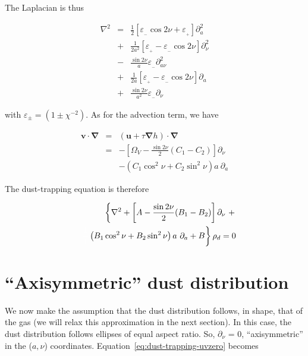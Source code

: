 \documentclass[apj]{emulateapj}
\renewcommand{\v}[1]{{\boldsymbol{#1}}} %
\def\white#1{\textcolor{white}{#1}}
\newcommand{\del}{\v{\nabla}}
\newcommand{\grad}{\del}
\newcommand{\Laplace}{\nabla^2}
\newcommand{\beq}{\begin{equation}}
\newcommand{\eeq}{\end{equation}}
\newcommand{\beqn}{\begin{eqnarray}}
\newcommand{\eeqn}{\end{eqnarray}}
\newcommand{\epsp}{\varepsilon_{_{+}}}
\newcommand{\epsm}{\varepsilon_{_{-}}}
\begin{document}
The Laplacian is thus 

\beqn
\Laplace{} &= &\frac{1}{2}\left[ \epsm \cos 2\nu + \epsp\right] \partial^2_a  \\
                &+& \frac{1}{2a^2}\left[ \epsp - \epsm \cos 2\nu\right] \partial^2_\nu  \\
                &-& \frac{\sin 2\nu}{a}\epsm \partial^2_{a\nu}  \\
                &+& \frac{1}{2a}\left[ \epsp - \epsm \cos 2\nu\right] \partial_a  \\
                &+& \frac{\sin 2\nu}{a^2} \epsm\partial_\nu
\eeqn

\noindent with $\varepsilon_{\pm} = (1 \pm \chi^{-2})$.  As for the advection term, we have 

\beqn
\v{v}\cdot\del &=& (\v{u} + \tau \grad h) \cdot \del \nonumber \\
&=& - \left[\varOmega_V - \frac{\sin2\nu}{2}  (C_1 -  C_2)\right]\partial_\nu \nonumber \\
&&- \left( C_1 \cos^2\nu   + C_2\sin^2\nu \right) a \ \partial_a 
\eeqn


The dust-trapping equation is therefore 


\beqn \label{eq:dust-trapping-uvzero}
&& \left\{ \Laplace{} + \left[A - \frac{\sin2\nu}{2}  (B_1 - B_2)\right]\partial_\nu \ +  \right.  \nonumber\\
&& \left. \white{\frac{1}{1}}\left( B_1 \cos^2\nu   + B_2\sin^2\nu
  \right) a \ \partial_a  + B \right\} \rho_d = 0 
\eeqn



\section{``Axisymmetric'' dust distribution}

We now make the assumption that the dust distribution follows, in shape, that of
the gas (we will relax this approximation in the next section). In this case, the
dust distribution follows ellipses of equal aspect ratio. So,
$\partial_\nu$ = 0, ``axisymmetric'' in the ($a,\nu$)
coordinates. Equation~\ref{eq:dust-trapping-uvzero} becomes
\end{document}

